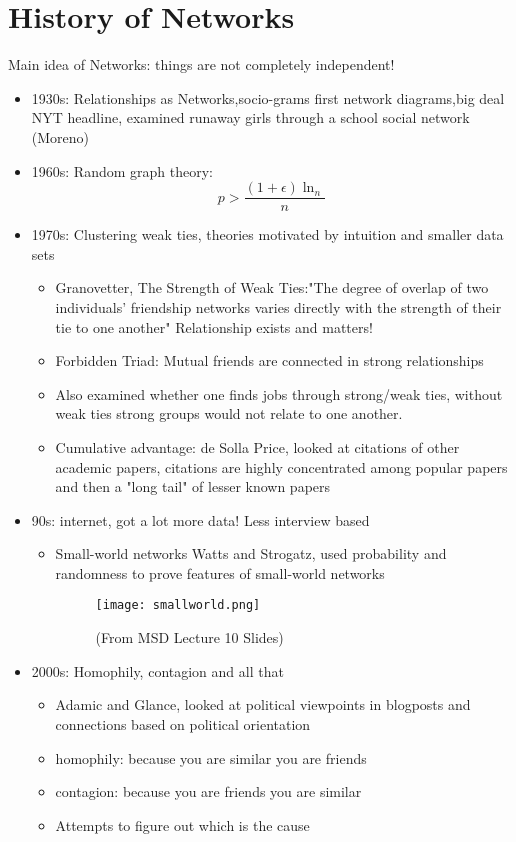 \section{History of Networks}
Main idea of Networks: things are not completely independent! 
\begin{itemize}
  \item 1930s: Relationships as Networks,socio-grams first network diagrams,big deal NYT headline, examined runaway girls through a school social network (Moreno) 
  \item 1960s: Random graph theory:
  \begin{equation}
      p > \frac{(1+\epsilon)\ln_n }{n}
  \end{equation}
  \item 1970s: Clustering weak ties, theories motivated by intuition and smaller data sets 
  \begin{itemize}
  \item  Granovetter, The Strength of Weak Ties:"The degree of overlap of two individuals' friendship networks varies directly with the strength of their tie to one another"  Relationship exists and matters! 
  \item Forbidden Triad: Mutual friends are connected in strong relationships 
  \item Also examined whether one finds jobs through strong/weak ties, without weak ties strong groups would not relate to one another. 
   \item Cumulative advantage: de Solla Price, looked at citations of other academic papers, citations are highly concentrated among popular papers and then a "long tail" of lesser known papers  
  \end{itemize}
  \item 90s: internet, got a lot more data! Less interview based 
  \begin{itemize}
      \item  Small-world networks Watts and Strogatz, used probability and randomness to prove features of small-world networks 
      \clearpage
      \begin{figure}[ht]
  \begin{center}
    \texttt{[image: smallworld.png]}
    \caption{(From MSD Lecture 10 Slides) 
     }
    \label{fig:example_figure}
  \end{center}
\end{figure}
  \end{itemize}
  \item 2000s: Homophily, contagion and all that
  \begin{itemize}
      \item Adamic and Glance, looked at political viewpoints in blogposts and connections based on political orientation
      \item homophily: because you are similar you are friends
      \item contagion: because you are friends you are similar 
      \item Attempts to figure out which is the cause 
  \end{itemize}
\end{itemize}
